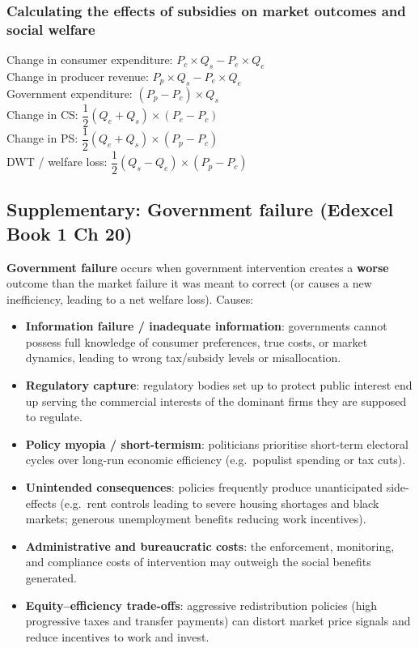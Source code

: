 \documentclass[a4paper,12pt]{article}
\newcommand{\needbold}[1]{\textcolor{red!70!black}{\textbf{#1}}}
\begin{document}
\subsubsection*{Calculating the effects of subsidies on market outcomes and social welfare}
Change in consumer expenditure: $P_c\times Q_s-P_e\times Q_e$\\
Change in producer revenue: $P_p\times Q_s-P_e\times Q_e$\\
Government expenditure: $(P_p-P_c)\times Q_s$\\
Change in CS: $\dfrac{1}{2}(Q_e+Q_s)\times (P_e-P_c)$\\
Change in PS: $\dfrac{1}{2}(Q_e+Q_s)\times (P_p-P_c)$\\
DWT / welfare loss: $\dfrac{1}{2}(Q_s-Q_e)\times (P_p-P_c)$

\subsection{Supplementary: Government failure (Edexcel Book 1 Ch 20)}
\needbold{Government failure} occurs when government intervention creates a \textbf{worse} outcome than the market failure it was meant to correct (or causes a new inefficiency, leading to a net welfare loss). Causes:
\begin{itemize}
  \item \textbf{Information failure / inadequate information}: governments cannot possess full knowledge of consumer preferences, true costs, or market dynamics, leading to wrong tax/subsidy levels or misallocation.
  \item \textbf{Regulatory capture}: regulatory bodies set up to protect public interest end up serving the commercial interests of the dominant firms they are supposed to regulate.
  \item \textbf{Policy myopia / short-termism}: politicians prioritise short-term electoral cycles over long-run economic efficiency (e.g.\ populist spending or tax cuts).
  \item \textbf{Unintended consequences}: policies frequently produce unanticipated side-effects (e.g.\ rent controls leading to severe housing shortages and black markets; generous unemployment benefits reducing work incentives).
  \item \textbf{Administrative and bureaucratic costs}: the enforcement, monitoring, and compliance costs of intervention may outweigh the social benefits generated.
  \item \textbf{Equity--efficiency trade-offs}: aggressive redistribution policies (high progressive taxes and transfer payments) can distort market price signals and reduce incentives to work and invest.
\end{itemize}
\end{document}
